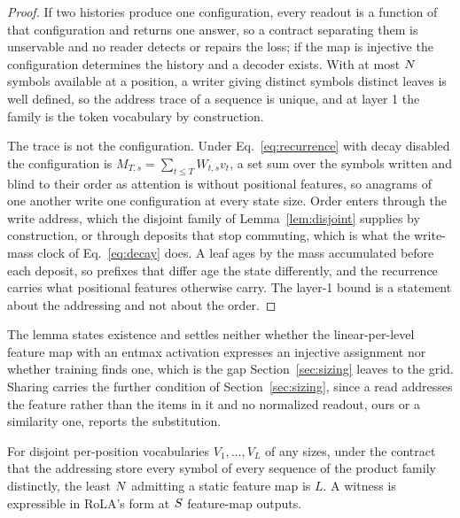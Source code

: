 \begin{proof}
If two histories produce one configuration, every readout is a function of that configuration and returns one answer, so a contract separating them is unservable and no reader detects or repairs the loss; if the map is injective the configuration determines the history and a decoder exists. With at most $N$ symbols available at a position, a writer giving distinct symbols distinct leaves is well defined, so the address trace of a sequence is unique, and at layer 1 the family is the token vocabulary by construction.

The trace is not the configuration. Under Eq.~\eqref{eq:recurrence} with decay disabled the configuration is $M_{T,s} = \sum_{t \le T} W_{t,s} v_t$, a set sum over the symbols written and blind to their order as attention is without positional features, so anagrams of one another write one configuration at every state size. Order enters through the write address, which the disjoint family of Lemma~\ref{lem:disjoint} supplies by construction, or through deposits that stop commuting, which is what the write-mass clock of Eq.~\eqref{eq:decay} does. A leaf ages by the mass accumulated before each deposit, so prefixes that differ age the state differently, and the recurrence carries what positional features otherwise carry. The layer-1 bound is a statement about the addressing and not about the order.
\end{proof}

The lemma states existence and settles neither whether the linear-per-level feature map with an entmax activation expresses an injective assignment nor whether training finds one, which is the gap Section~\ref{sec:sizing} leaves to the grid. Sharing carries the further condition of Section~\ref{sec:sizing}, since a read addresses the feature rather than the items in it and no normalized readout, ours or a similarity one, reports the substitution.

\begin{lemma}[Disjoint families are tight at $\Nst = L$]
\label{lem:disjoint}
For disjoint per-position vocabularies $V_1,\dots,V_L$ of any sizes, under the contract that the addressing store every symbol of every sequence of the product family distinctly, the least $N$ admitting a static feature map is $L$. A witness is expressible in RoLA's form at $S$ feature-map outputs.
\end{lemma}

